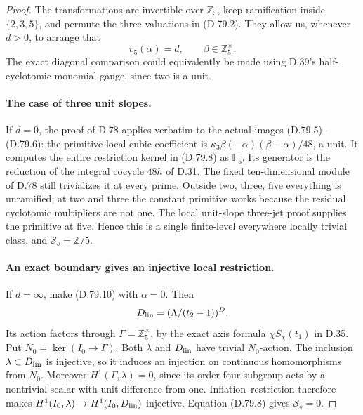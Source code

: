 \begin{proof}
The transformations are invertible over \(\mathbb Z_5\), keep
ramification inside \(\{2,3,5\}\), and permute the three
valuations in (D.79.2). They allow us, whenever \(d>0\), to
arrange that
\[
 v_5(\alpha)=d,\qquad \beta\in\mathbb Z_5^\times.
                                                               \tag{D.79.10}
\]
The exact diagonal comparison could equivalently be made using
D.39's half-cyclotomic monomial gauge, since two is a unit.

\paragraph{The case of three unit slopes.}
If \(d=0\), the proof of D.78 applies verbatim to the actual
images (D.79.5)--(D.79.6): the primitive local cubic coefficient
is \(\kappa_3\beta(-\alpha)(\beta-\alpha)/48\), a unit.
It computes the entire restriction kernel in (D.79.8) as
\(\mathbb F_5\). Its generator is the reduction of the integral
cocycle \(48h\) of D.31. The fixed ten-dimensional module of
D.78 still trivializes it at every prime. Outside two, three,
five everything is unramified; at two and three the constant
primitive works because the residual cyclotomic multipliers
are not one. The local unit-slope three-jet proof supplies
the primitive at five. Hence this is a single finite-level
everywhere locally trivial class, and
\(\mathcal S_s=\mathbb Z/5\).

\paragraph{An exact boundary gives an injective local restriction.}
If \(d=\infty\), make (D.79.10) with \(\alpha=0\).
Then
\[
 D_{\rm lin}=(\Lambda/(t_2-1))^D.
\]
Its action factors through \(\Gamma=\mathbb Z_5^\times\),
by the exact axis formula \(\chi S_\chi(t_1)\) in D.35.
Put \(N_0=\ker(I_0\to\Gamma)\). Both \(\lambda\) and
\(D_{\rm lin}\) have trivial \(N_0\)-action. The inclusion
\(\lambda\subset D_{\rm lin}\) is injective, so it induces
an injection on continuous homomorphisms from \(N_0\).
Moreover
\(H^1(\Gamma,\lambda)=0\), since its order-four subgroup
acts by a nontrivial scalar with unit difference from one.
Inflation--restriction therefore makes
\(H^1(I_0,\lambda)\to H^1(I_0,D_{\rm lin})\) injective.
Equation (D.79.8) gives \(\mathcal S_s=0\).


\end{proof}
